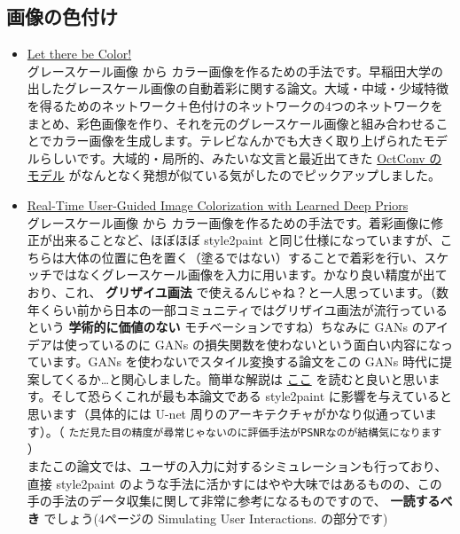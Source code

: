 \documentclass[a4paper, dvipdfmx, 10pt]{article}
\begin{document}
\subsection{画像の色付け}
\label{sec:org0bf5166}
\begin{itemize}
\item \href{http://iizuka.cs.tsukuba.ac.jp/projects/colorization/ja/}{Let there be Color!}\\

グレースケール画像 から カラー画像を作るための手法です。早稲田大学の出したグレースケール画像の自動着彩に関する論文。大域・中域・少域特徴を得るためのネットワーク＋色付けのネットワークの4つのネットワークをまとめ、彩色画像を作り、それを元のグレースケール画像と組み合わせることでカラー画像を生成します。テレビなんかでも大きく取り上げられたモデルらしいです。大域的・局所的、みたいな文言と最近出てきた \href{https://qiita.com/koshian2/items/0e40a5930f1aa63a66b9}{OctConv のモデル} がなんとなく発想が似ている気がしたのでピックアップしました。\\

\item \href{https://richzhang.github.io/ideepcolor/}{Real-Time User-Guided Image Colorization with Learned Deep Priors}\\

グレースケール画像 から カラー画像を作るための手法です。着彩画像に修正が出来ることなど、ほぼほぼ style2paint と同じ仕様になっていますが、こちらは大体の位置に色を置く（塗るではない）することで着彩を行い、スケッチではなくグレースケール画像を入力に用います。かなり良い精度が出ており、これ、 \textbf{グリザイユ画法} で使えるんじゃね？と一人思っています。（数年くらい前から日本の一部コミュニティではグリザイユ画法が流行っているという \textbf{学術的に価値のない} モチベーションですね）ちなみに GANs のアイデアは使っているのに GANs の損失関数を使わないという面白い内容になっています。GANs を使わないでスタイル変換する論文をこの GANs 時代に提案してくるか…と関心しました。簡単な解説は \href{https://github.com/DwangoMediaVillage/paper\_readings/issues/8}{ここ} を読むと良いと思います。そして恐らくこれが最も本論文である style2paint に影響を与えていると思います（具体的には U-net 周りのアーキテクチャがかなり似通っています）。（ \texttt{ただ見た目の精度が尋常じゃないのに評価手法がPSNRなのが結構気になります} ）\\

またこの論文では、ユーザの入力に対するシミュレーションも行っており、直接 style2paint のような手法に活かすにはやや大味ではあるものの、この手の手法のデータ収集に関して非常に参考になるものですので、 \textbf{一読するべき} でしょう(4ページの Simulating User Interactions. の部分です)\\


\end{itemize}
\end{document}
